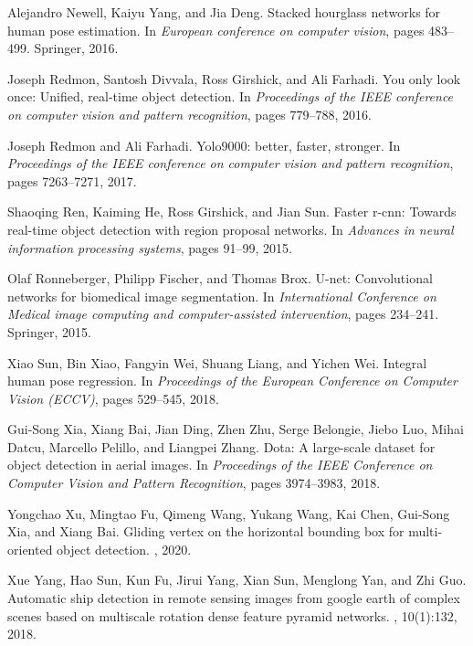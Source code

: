 \documentclass[10pt,twocolumn,letterpaper]{article}
\begin{document}
\begin{thebibliography}{10}
Alejandro Newell, Kaiyu Yang, and Jia Deng.
\newblock Stacked hourglass networks for human pose estimation.
\newblock In {\em European conference on computer vision}, pages 483--499.
  Springer, 2016.

Joseph Redmon, Santosh Divvala, Ross Girshick, and Ali Farhadi.
\newblock You only look once: Unified, real-time object detection.
\newblock In {\em Proceedings of the IEEE conference on computer vision and
  pattern recognition}, pages 779--788, 2016.

Joseph Redmon and Ali Farhadi.
\newblock Yolo9000: better, faster, stronger.
\newblock In {\em Proceedings of the IEEE conference on computer vision and
  pattern recognition}, pages 7263--7271, 2017.

Shaoqing Ren, Kaiming He, Ross Girshick, and Jian Sun.
\newblock Faster r-cnn: Towards real-time object detection with region proposal
  networks.
\newblock In {\em Advances in neural information processing systems}, pages
  91--99, 2015.

Olaf Ronneberger, Philipp Fischer, and Thomas Brox.
\newblock U-net: Convolutional networks for biomedical image segmentation.
\newblock In {\em International Conference on Medical image computing and
  computer-assisted intervention}, pages 234--241. Springer, 2015.

Xiao Sun, Bin Xiao, Fangyin Wei, Shuang Liang, and Yichen Wei.
\newblock Integral human pose regression.
\newblock In {\em Proceedings of the European Conference on Computer Vision
  (ECCV)}, pages 529--545, 2018.

Gui-Song Xia, Xiang Bai, Jian Ding, Zhen Zhu, Serge Belongie, Jiebo Luo, Mihai
  Datcu, Marcello Pelillo, and Liangpei Zhang.
\newblock Dota: A large-scale dataset for object detection in aerial images.
\newblock In {\em Proceedings of the IEEE Conference on Computer Vision and
  Pattern Recognition}, pages 3974--3983, 2018.

Yongchao Xu, Mingtao Fu, Qimeng Wang, Yukang Wang, Kai Chen, Gui-Song Xia, and
  Xiang Bai.
\newblock Gliding vertex on the horizontal bounding box for multi-oriented
  object detection.
,
  2020.

Xue Yang, Hao Sun, Kun Fu, Jirui Yang, Xian Sun, Menglong Yan, and Zhi Guo.
\newblock Automatic ship detection in remote sensing images from google earth
  of complex scenes based on multiscale rotation dense feature pyramid
  networks.
, 10(1):132, 2018.


\end{thebibliography}
\end{document}
